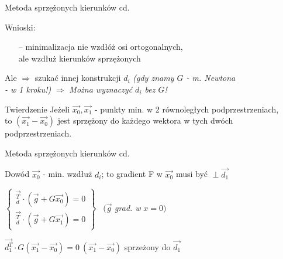   \begin{frame}{Metoda sprzężonych kierunków cd.}

 	\begin{block}{Wnioski:}
		\begin{itemize}
			\item[--] minimalizacja nie wzdłóż osi ortogonalnych,
			\\ale wzdłuż kierunków sprzężonych
		\end{itemize}
 	\end{block}
 	\begin{block}{}
		Ale $\Rightarrow$ szukać innej konstrukcji $d_i$ \emph{(gdy znamy $G$ - m. Newtona
		\\- w 1 kroku!)} $\Rightarrow$ \emph{Można wyznaczyć $d_i$ bez $G$!}
 	\end{block}
 	\begin{block}{Twierdzenie}
		Jeżeli $\vec{x_0}, \vec{x_1}$ - punkty min. w 2 równoległych podprzestrzeniach,
		\\to $(\vec{x_1} - \vec{x_0})$ jest sprzężony do każdego wektora w tych dwóch podprzestrzeniach.
 	\end{block}

  \end{frame}

  \begin{frame}{Metoda sprzężonych kierunków cd. }

 	\begin{block}{Dowód}
	  $\vec{x_0}$ - min. wzdłuż $d_i$; to gradient F w $\vec{x_0}$ musi być $\perp \vec{d_1}$
	  \smallskip
	  \begin{center}
	    $ \left\{
          \begin{array}{l}
            \vec{_d^T} \cdot (\vec{g} + G \vec{x_0}) = 0 \\
            \vec{_d^T} \cdot (\vec{g} + G \vec{x_1}) = 0
	      \end{array}
	    \right\} $
	    \ $(\vec{g}$ \emph{grad. w} $x = 0)$
	  \end{center}
	  \begin{center}
	    $\vec{d_1^T} \cdot G (\vec{x_1} - \vec{x_0}) = 0  \  (\vec{x_1} - \vec{x_0})$ sprzeżony do $\vec{d_1}$
	  \end{center}
 	\end{block}

  \end{frame}

